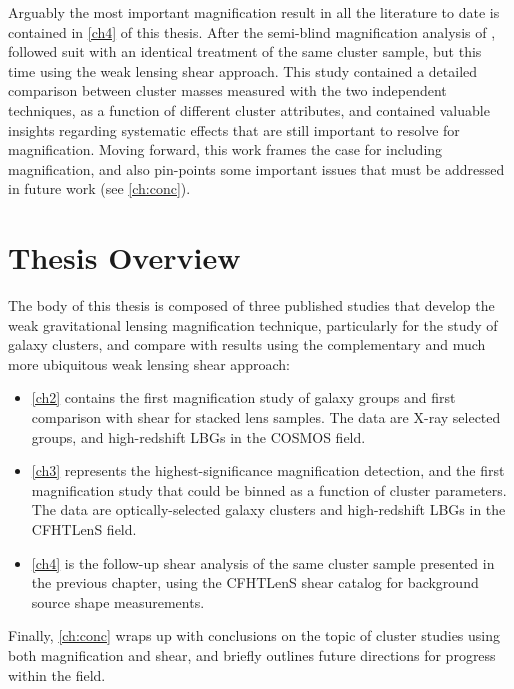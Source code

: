 Arguably the most important magnification result in all the literature to date is contained in \autoref{ch4} of this thesis. After the semi-blind magnification analysis of \citet{Ford14}, \citet{Ford15} followed suit with an identical treatment of the same cluster sample, but this time using the weak lensing shear approach. This study contained a detailed comparison between cluster masses measured with the two independent techniques, as a function of different cluster attributes, and contained valuable insights regarding systematic effects that are still important to resolve for magnification. Moving forward, this work frames the case for including magnification, and also pin-points some important issues that must be addressed in future work (see \autoref{ch:conc}).

\section{Thesis Overview}
\label{sec:Overview}

The body of this thesis is composed of three published studies that develop the weak gravitational lensing magnification technique, particularly for the study of galaxy clusters, and compare with results using the complementary and much more ubiquitous weak lensing shear approach:
\begin{itemize}
\item \autoref{ch2} contains the first magnification study of galaxy groups and first comparison with shear for stacked lens samples. The data are X-ray selected groups, and high-redshift \ac{LBG}s in the \ac{COSMOS} field.
\item \autoref{ch3} represents the highest-significance magnification detection, and the first magnification study that could be binned as a function of cluster parameters. The data are optically-selected galaxy clusters and high-redshift \ac{LBG}s in the \ac{CFHTLenS} field.
\item \autoref{ch4} is the follow-up shear analysis of the same cluster sample presented in the previous chapter, using the \ac{CFHTLenS} shear catalog for background source shape measurements.
\end{itemize}
Finally, \autoref{ch:conc} wraps up with conclusions on the topic of cluster studies using both magnification and shear, and briefly outlines future directions for progress within the field.

\endinput
Any text after an \endinput is ignored.
You could put scraps here or things in progress.
